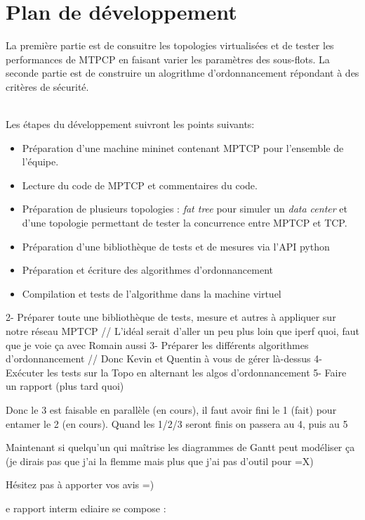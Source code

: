 \section{Plan de d\'eveloppement}
\label{sec:plan:devt}



La première partie est de consuitre les topologies virtualisées et de
tester les performances de MTPCP en faisant varier les paramètres des
sous-flots. La seconde partie est de construire un alogrithme
d'ordonnancement répondant à des critères de sécurité.

\\Les étapes du développement suivront les points suivants:

\begin{itemize}
\item Préparation d'une machine mininet contenant MPTCP pour
  l'ensemble de l'équipe.
\item Lecture du code de MPTCP et commentaires du code.
\item Préparation de plusieurs topologies : \emph{fat tree} pour
  simuler un \emph{data center} et d'une topologie permettant de
  tester la concurrence entre MPTCP et TCP.
\item Préparation d'une bibliothèque de tests et de mesures via l'API python
\item Préparation et écriture des algorithmes d'ordonnancement
\item Compilation et tests de l'algorithme dans la machine virtuel
\end{itemize}

 





2- Préparer toute une bibliothèque de tests, mesure et autres à
appliquer sur notre réseau MPTCP // L'idéal serait d'aller un peu plus
loin que iperf quoi, faut que je voie ça avec Romain aussi 3- Préparer
les différents algorithmes d'ordonnancement // Donc Kevin et Quentin à
vous de gérer là-dessus 4- Exécuter les tests sur la Topo en alternant
les algos d'ordonnancement 5- Faire un rapport (plus tard quoi)

Donc le 3 est faisable en parallèle (en cours), il faut avoir fini le
1 (fait) pour entamer le 2 (en cours).  Quand les 1/2/3 seront finis
on passera au 4, puis au 5

Maintenant si quelqu'un qui maîtrise les diagrammes de Gantt peut
modéliser ça (je dirais pas que j'ai la flemme mais plus que j'ai pas
d'outil pour =X)

Hésitez pas à apporter vos avis =)


e rapport interm ediaire se compose :

